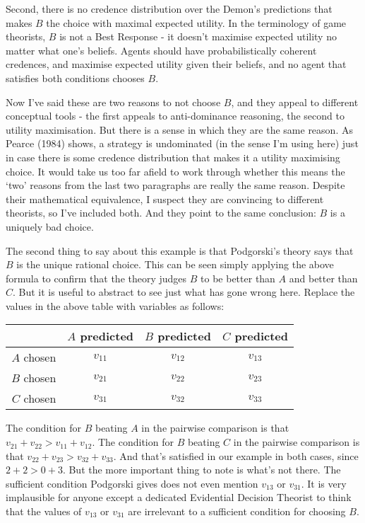 \documentclass[11pt,]{article}
\begin{document}
Second, there is no credence distribution over the Demon's predictions that makes \(B\) the choice with maximal expected utility. In the terminology of game theorists, \(B\) is not a Best Response - it doesn't maximise expected utility no matter what one's beliefs. Agents should have probabilistically coherent credences, and maximise expected utility given their beliefs, and no agent that satisfies both conditions chooses \(B\).

Now I've said these are two reasons to not choose \(B\), and they appeal to different conceptual tools - the first appeals to anti-dominance reasoning, the second to utility maximisation. But there is a sense in which they are the same reason. As Pearce (1984) shows, a strategy is undominated (in the sense I'm using here) just in case there is some credence distribution that makes it a utility maximising choice. It would take us too far afield to work through whether this means the `two' reasons from the last two paragraphs are really the same reason. Despite their mathematical equivalence, I suspect they are convincing to different theorists, so I've included both. And they point to the same conclusion: \(B\) is a uniquely bad choice.

The second thing to say about this example is that Podgorski's theory says that \(B\) is the unique rational choice. This can be seen simply applying the above formula to confirm that the theory judges \(B\) to be better than \(A\) and better than \(C\). But it is useful to abstract to see just what has gone wrong here. Replace the values in the above table with variables as follows:

\begin{longtable}[]{@{}rccc@{}}
\toprule
& \(A\) predicted & \(B\) predicted & \(C\) predicted\tabularnewline
\midrule
\endhead
\(A\) chosen & \(v_{11}\) & \(v_{12}\) & \(v_{13}\)\tabularnewline
\(B\) chosen & \(v_{21}\) & \(v_{22}\) & \(v_{23}\)\tabularnewline
\(C\) chosen & \(v_{31}\) & \(v_{32}\) & \(v_{33}\)\tabularnewline
\bottomrule
\end{longtable}

The condition for \(B\) beating \(A\) in the pairwise comparison is that \(v_{21} + v_{22} > v_{11} + v_{12}\). The condition for \(B\) beating \(C\) in the pairwise comparison is that \(v_{22} + v_{23} > v_{32} + v_{33}\). And that's satisfied in our example in both cases, since \(2 + 2 > 0 + 3\). But the more important thing to note is what's not there. The sufficient condition Podgorski gives does not even mention \(v_{13}\) or \(v_{31}\). It is very implausible for anyone except a dedicated Evidential Decision Theorist to think that the values of \(v_{13}\) or \(v_{31}\) are irrelevant to a sufficient condition for choosing \(B\).
\end{document}
